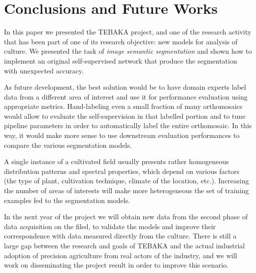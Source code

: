 \documentclass[comsoc,final]{IEEEtran}
\begin{document}
\section{Conclusions and Future Works}\label{sec:conclusion}

In this paper we presented the TEBAKA project, and one of the research activity that has been part of one of its research objective: new models for analysis of culture. We presented the task of \emph{image semantic segmentation} and shown how to implement an original self-supervised network that produce the segmentation with unexpected accuracy. 

 As future development, the best solution would be to have domain experts label data from a different area of interest and use it for performance evaluation using appropriate metrics. Hand-labeling even a small fraction of many orthomosaics would allow to evaluate the self-supervision in that labelled portion and to tune pipeline parameters in order to automatically label the entire orthomosaic. In this way, it would make more sense to use downstream evaluation performances to compare the various segmentation models. 
 
 A single instance of a cultivated field usually presents rather homogeneous distribution patterns and spectral properties, which depend on various factors (the type of plant, cultivation technique, climate of the location, etc.). Increasing the number of areas of interests will make more heterogeneous the set of training examples fed to the segmentation models.

In the next year of the project we will obtain new data from the second phase of data acquisition on the filed, to validate the models and improve their correspondence with data measured directly from the culture. There is still a large gap between the research and goals of TEBAKA and the actual industrial adoption of precision agriculture from real actors of the industry, and we will work on disseminating the project result in order to improve this scenario.

\printbibliography
\end{document}
